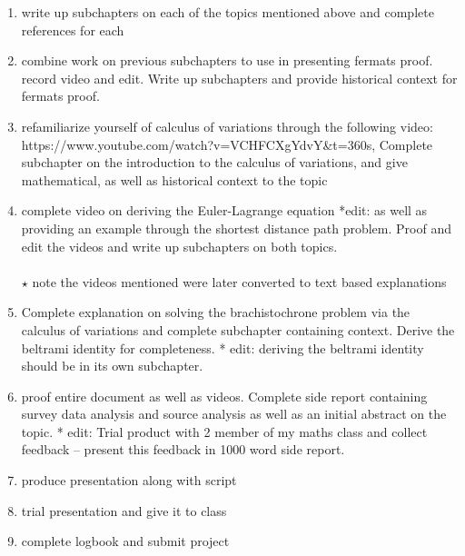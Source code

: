\documentclass[12pt]{report}
\begin{document}
\begin{enumerate}
    \item write up subchapters on each of the topics mentioned above and complete references for each
    
    \item combine work on previous subchapters to use in presenting fermats proof. record video and edit. Write up subchapters and provide historical context for fermats proof.
    
    \item refamiliarize yourself of calculus of variations through the following video: https://www.youtube.com/watch?v=VCHFCXgYdvY&t=360s, Complete subchapter on the introduction to the calculus of variations, and give mathematical, as well as historical context to the topic
    
    \item complete video on deriving the Euler-Lagrange equation *edit: as well as providing an example through the shortest distance path problem. Proof and edit the videos and write up subchapters on both topics.
    \\
    \\
    \(\star\) note the videos mentioned were later converted to text based explanations
    
    \item Complete explanation on solving the brachistochrone problem via the calculus of variations and complete subchapter containing context. Derive the beltrami identity for completeness. * edit: deriving the beltrami identity should be in its own subchapter.
    
    \item proof entire document as well as videos. Complete side report containing survey data analysis and source analysis as well as an initial abstract on the topic. * edit: Trial product with 2 member of my maths class and collect feedback – present this feedback in 1000 word side report. 
    
    \item produce presentation along with script
    \item trial presentation and give it to class
    
    \item complete logbook and submit project


\end{enumerate}
\end{document}
